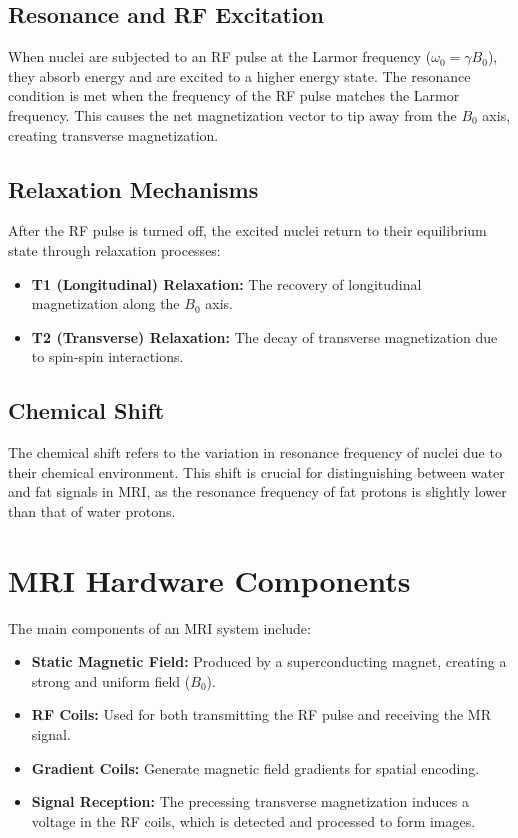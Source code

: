 \subsection{Resonance and RF Excitation}
When nuclei are subjected to an RF pulse at the Larmor frequency ($\omega_0 = \gamma B_0$), they absorb energy and are excited to a higher energy state. The resonance condition is met when the frequency of the RF pulse matches the Larmor frequency. This causes the net magnetization vector to tip away from the $B_0$ axis, creating transverse magnetization.

\subsection{Relaxation Mechanisms}
After the RF pulse is turned off, the excited nuclei return to their equilibrium state through relaxation processes:
\begin{itemize}
    \item \textbf{T1 (Longitudinal) Relaxation:} The recovery of longitudinal magnetization along the $B_0$ axis.
    \item \textbf{T2 (Transverse) Relaxation:} The decay of transverse magnetization due to spin-spin interactions.
\end{itemize}

\subsection{Chemical Shift}
The chemical shift refers to the variation in resonance frequency of nuclei due to their chemical environment. This shift is crucial for distinguishing between water and fat signals in MRI, as the resonance frequency of fat protons is slightly lower than that of water protons.

\section{MRI Hardware Components}
The main components of an MRI system include:
\begin{itemize}
    \item \textbf{Static Magnetic Field:} Produced by a superconducting magnet, creating a strong and uniform field ($B_0$).
    \item \textbf{RF Coils:} Used for both transmitting the RF pulse and receiving the MR signal.
    \item \textbf{Gradient Coils:} Generate magnetic field gradients for spatial encoding.
    \item \textbf{Signal Reception:} The precessing transverse magnetization induces a voltage in the RF coils, which is detected and processed to form images.
\end{itemize}

